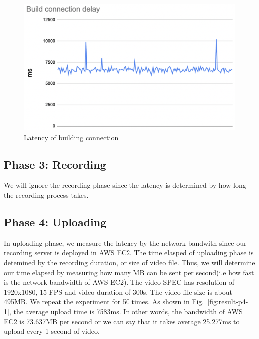 \begin{figure}[H]
    \centering
    \includegraphics[width=\textwidth]{figsrc/result-p2-3.png}
    \caption{Latency of building connection\label{fig:result-p2-3}}
\end{figure}

\subsection{Phase 3: Recording}
We will ignore the recording phase since the latency is determined by how long the recording process takes.

\subsection{Phase 4: Uploading}
In uploading phase, we measure the latency by the network bandwith since our recording server is deployed in AWS EC2. The time elasped of uploading phase is detemined by the recording duration, or size of video file. Thus, we will determine our time elapsed by measuring how many MB can be sent per second(i.e how fast is the network bandwidth of AWS EC2). The video SPEC has resolution of 1920x1080, 15 FPS and video duration of 300s. The video file size is about 495MB. We repeat the experiment for 50 times. As shown in Fig.~\ref{fig:result-p4-1}, the average upload time is 7583ms. In other words, the bandwidth of AWS EC2 is 73.637MB per second or we can say that it takes average 25.277ms to upload every 1 second of video.

